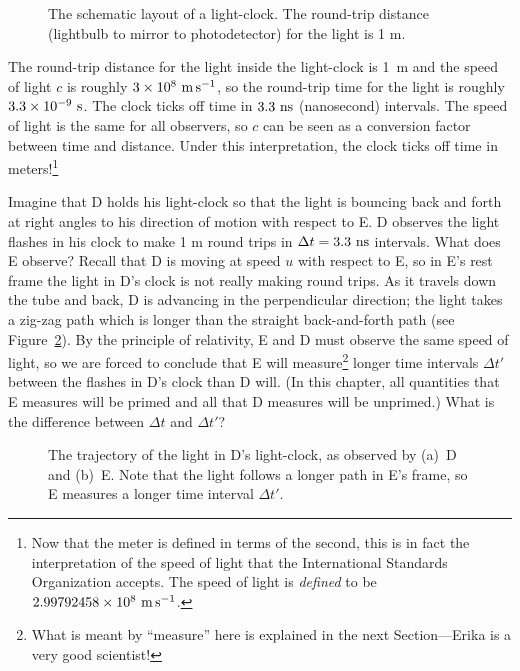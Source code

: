 \begin{figure}
\caption[Schematic of a light-clock]{
The schematic layout of a light-clock.  The round-trip distance
(lightbulb to mirror to photodetector) for the light is 1 m.}
\label{fig:lightclock}
\end{figure}

The round-trip distance for the light inside the light-clock is 1~m
and the speed of light $c$ is roughly $3\times 10^8~{\rm m\,s^{-1}}$, so the
round-trip time for the light is roughly $3.3\times 10^{-9}~{\rm s}$.
The clock ticks off time in $3.3~{\rm ns}$ (nanosecond) intervals.
The speed of light is the same for all observers, so $c$ can be seen
as a conversion factor between time and distance.  Under this
interpretation, the clock ticks off time in meters!\footnote{Now that
the meter is defined in terms of the second, this is in fact the
interpretation of the speed of light that the International Standards
Organization accepts.  The speed of light is {\em defined\/} to be
$2.99792458\times 10^8~{\rm m\,s^{-1}}$.}


Imagine that D holds his light-clock so that the light is bouncing
back and forth at right angles to his direction of motion with respect
to E.  D observes the light flashes in his clock to make 1 m round
trips in $\Delta t=3.3~{\rm ns}$ intervals.  What does E observe?
Recall that D is moving at speed $u$ with respect to E, so in E's rest
frame the light in D's clock is not really making round trips.  As it
travels down the tube and back, D is advancing in the perpendicular
direction; the light takes a zig-zag path which is longer than the
straight back-and-forth path (see Figure~\ref{fig:trajectories}).  By
the principle of relativity, E and D must observe the same speed of
light, so we are forced to conclude that E will measure\footnote{What
is meant by ``measure'' here is explained in the next Section---Erika
is a very good scientist!} longer time intervals $\Delta t'$ between
the flashes in D's clock than D will.  (In this chapter, all
quantities that E measures will be primed and all that D measures will
be unprimed.)  What is the difference between $\Delta t$ and $\Delta
t'$?

\begin{figure}
\caption[Trajectories of light seen by D and E]{The trajectory of the
light in D's light-clock, as observed by (a)~D and (b)~E.  Note that
the light follows a longer path in E's frame, so E measures a longer
time interval $\Delta t'$.}
\label{fig:trajectories}
\end{figure}

